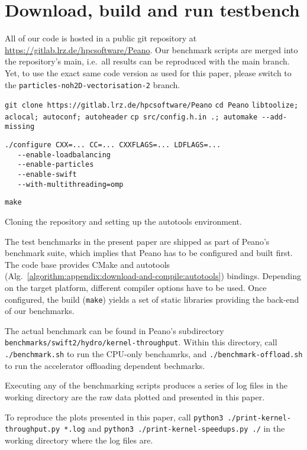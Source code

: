 \section{Download, build and run testbench}
\label{appendix:download-and-compilation}

All of our code is hosted in a public git repository 
at \url{https://gitlab.lrz.de/hpcsoftware/Peano}. 
Our benchmark scripts are merged into the repository's
main, i.e.~all results can be reproduced with the main branch. 
Yet, to use the exact same code version as used for this paper, please switch to 
the \linebreak \texttt{particles-noh2D-vectorisation-2} branch.


\begin{algorithm}[htb]
    \begin{algorithmic}[1]
      \State \verb|git clone https://gitlab.lrz.de/hpcsoftware/Peano|
      \State \verb|cd Peano|
      \State \verb|libtoolize; aclocal; autoconf; autoheader|
      \State \verb|cp src/config.h.in .; automake --add-missing|
      \State \begin{verbatim}
./configure CXX=... CC=... CXXFLAGS=... LDFLAGS=... 
   --enable-loadbalancing 
   --enable-particles 
   --enable-swift 
   --with-multithreading=omp
\end{verbatim}
      \State \verb|make|
    \end{algorithmic}
  \caption{
    Cloning the repository and setting up the autotools environment. 
    \label{algorithm:appendix:download-and-compile:autotools}
    }
\end{algorithm}


The test benchmarks in the present paper are shipped as part of Peano's
benchmark suite, which implies that Peano has to be configured and built first.
The code base provides CMake and autotools (Alg.~\ref{algorithm:appendix:download-and-compile:autotools})
bindings.
Depending on the target platform, different compiler options have to be used.
Once configured, the build (\texttt{make}) yields a set of static libraries
providing the back-end of our benchmarks.

The actual benchmark can be found in Peano's subdirectory \linebreak
\texttt{benchmarks/swift2/hydro/kernel-throughput}.
Within this directory, call \linebreak \texttt{./benchmark.sh} to run the CPU-only benchamrks, and \texttt{./benchmark-offload.sh} to run the accelerator offloading dependent bechmarks.

Executing any of the benchmarking scripts produces a series of log files in the working directory are the raw data plotted and presented in this paper.

To reproduce the plots presented in this paper, call \linebreak \texttt{python3 ./print-kernel-throughput.py *.log} and \linebreak \texttt{python3 ./print-kernel-speedups.py ./} in the working directory where the log files are.
